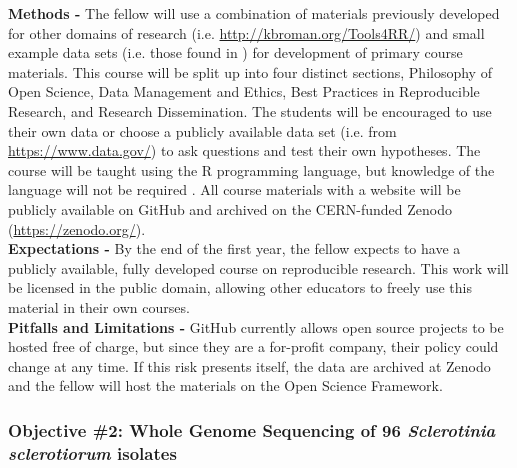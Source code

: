 \documentclass[12pt,letterpaper]{article}
\begin{document}
\noindent \textbf{Methods -} 
The fellow will use a combination of materials previously developed for other domains of research (i.e. \url{http://kbroman.org/Tools4RR/}) and small example data sets (i.e. those found in \citet{sparks2008ecology}) for development of primary course materials. 
This course will be split up into four distinct sections, Philosophy of Open Science, Data Management and Ethics, Best Practices in Reproducible Research, and Research Dissemination.
The students will be encouraged to use their own data or choose a publicly available data set (i.e. from \url{https://www.data.gov/}) to ask questions and test their own hypotheses.
The course will be taught using the R programming language, but knowledge of the language will not be required \citep{R2017}.
All course materials with a website will be publicly available on GitHub and archived on the CERN-funded Zenodo (\url{https://zenodo.org/}).\\
\noindent \textbf{Expectations -}
By the end of the first year, the fellow expects to have a publicly available, fully developed course on reproducible research.
This work will be licensed in the public domain, allowing other educators to freely use this material in their own courses.\\
\noindent \textbf{Pitfalls and Limitations -}
GitHub currently allows open source projects to be hosted free of charge, but since they are a for-profit company, their policy could change at any time. If this risk presents itself, the data are archived at Zenodo and the fellow will host the materials on the Open Science Framework.

\subsubsection{Objective \#2: Whole Genome Sequencing of 96 \textit{Sclerotinia sclerotiorum} isolates}
\end{document}
